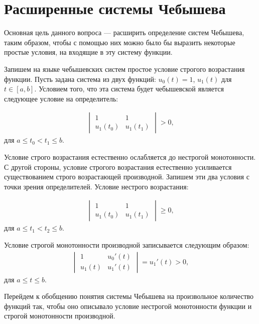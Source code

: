 \section{Расширенные системы Чебышева}

Основная цель данного вопроса --- расширить определение систем Чебышева, таким образом, чтобы с помощью
них можно было бы выразить некоторые простые условия, на входящие в эту систему функции.

Запишем на языке чебышевских систем простое условие строгого возрастания функции.
Пусть задана система из двух функций: $u_0(t) = 1$, $u_1(t)$ для $t \in [a, b]$.
Условием того, что эта система будет чебышевской является следующее условие на определитель:

\begin{gather*}
    \begin{vmatrix}
        1 & 1 \\
        u_1(t_0) & u_1(t_1)
    \end{vmatrix} 
    > 0,
\end{gather*}
для $a \leqslant t_0 < t_1 \leqslant b$.

Условие строго возрастания естественно ослабляется до нестрогой монотонности.
С другой стороны, условие строгого возрастания естественно усиливается существованием
строго возрастающей производной. Запишем эти два условия с точки зрения определителей.
Условие нестрого возрастания:

\begin{gather}
    \label{sec5::eq::strong_ar}
    \begin{vmatrix}
        1 & 1 \\
        u_1(t_0) & u_1(t_1)
    \end{vmatrix} 
    \geqslant 0,
\end{gather}
для $a \leqslant t_1 < t_2 \leqslant b$.

Условие строгой монотонности производной записывается следующим образом:
\begin{gather}
    \label{sec5::eq::strong_ar_d}
    \begin{vmatrix}
        1 & u_0'(t) \\
        u_1(t) & u_1'(t)
    \end{vmatrix} = u_1'(t) > 0, \end{gather} для $a \leqslant t \leqslant b$.

Перейдем к обобщению понятия системы Чебышева на произвольное количество функций
так, чтобы
оно описывало условие нестрогой монотонности функции и строгой монотонности производной.

